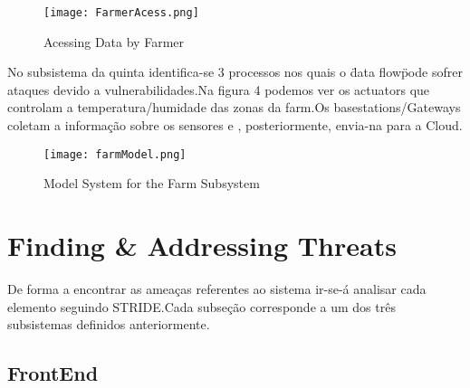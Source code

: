 \begin{figure}[h!]

	\centering

 	\texttt{[image: FarmerAcess.png]}

 	\caption {Acessing Data by Farmer}

  	\label{fig03}
\end{figure}

No subsistema da quinta identifica-se 3 processos nos quais o \"data flow\" pode sofrer ataques devido a vulnerabilidades.Na figura 4 podemos ver os actuators que controlam a temperatura/humidade das zonas da farm.Os basestations/Gateways coletam a informação sobre os sensores e , posteriormente, envia-na para a Cloud.

\begin{figure}[H]

	\centering

 	\texttt{[image: farmModel.png]}

 	\caption {Model System for the Farm Subsystem}

  	\label {fig04}
\end{figure}

\section{Finding \& Addressing Threats}

	De forma a encontrar as ameaças referentes ao sistema ir-se-á analisar cada elemento seguindo STRIDE.Cada subseção corresponde a um dos três subsistemas definidos anteriormente.



\subsection{FrontEnd}

